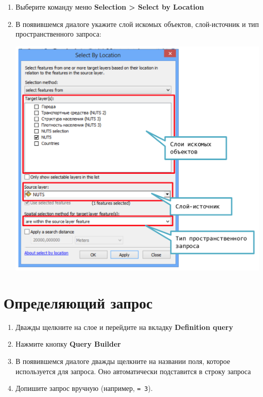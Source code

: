 \documentclass[12pt,]{book}
\begin{document}
\begin{enumerate}
\def\labelenumi{\arabic{enumi}.}
\item
  Выберите команду меню \textbf{Selection \textgreater{} Select by Location}
\item
  В появившемся диалоге укажите слой искомых объектов, слой-источник и тип пространственного запроса:

  \includegraphics{images/Appendix/image74.png}
\end{enumerate}

\hypertarget{manual-select-definition}{%
\section{Определяющий запрос}\label{manual-select-definition}}

\begin{enumerate}
\def\labelenumi{\arabic{enumi}.}
\item
  Дважды щелкните на слое и перейдите на вкладку \textbf{Definition query}
\item
  Нажмите кнопку \textbf{Query Builder}
\item
  В появившемся диалоге дважды щелкните на названии поля, которое используется для запроса. Оно автоматически подставится в строку запроса
\item
  Допишите запрос вручную (например, \texttt{=\ 3}).
\end{enumerate}
\end{document}
